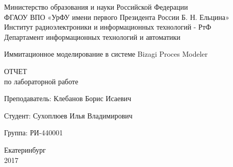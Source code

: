 \begin{center}
    Министерство образования и науки Российской Федерации\\
    ФГАОУ ВПО  «УрФУ имени первого Президента России Б. Н. Ельцина»\\
    Институт радиоэлектроники и информационных технологий - РтФ\\
    Департамент информационных технологий и автоматики
    \par
    \vspace{4.5cm}
    \Large{
      Иммитационное моделирование в  системе Bizagi Proces Modeler

      \par
      \vspace{0.5cm}

      ОТЧЕТ\\
      по лабораторной работе
    }

    \vspace{4cm}
    {
      Преподаватель: \hfill Клебанов Борис Исаевич
    }
    \par
    {
      Студент: \hfill Сухоплюев Илья Владимирович
    }
    \par
    {
      Группа: \hfill РИ-440001
    }

    \par
    \vspace{3.5cm}
    Екатеринбург\\
    2017
\end{center}
